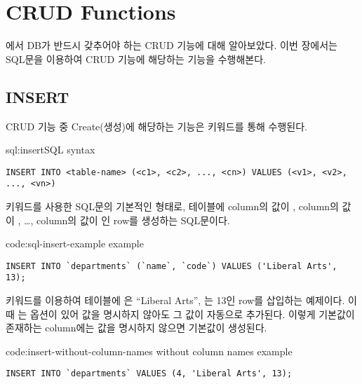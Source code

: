 \section{CRUD Functions}\label{sect:crud}

에서 DB가 반드시 갖추어야 하는 CRUD 기능에 대해 알아보았다. 이번 장에서는 SQL문을 이용하여 CRUD 기능에 해당하는 기능을 수행해본다.

\subsection*{INSERT}

CRUD 기능 중 Create(생성)에 해당하는 기능은  키워드를 통해 수행된다.

\begin{sql}{sql:insert}{SQL  syntax}
\begin{verbatim}
INSERT INTO <table-name> (<c1>, <c2>, ..., <cn>) VALUES (<v1>, <v2>, ..., <vn>)
\end{verbatim}
\end{sql}

\는  키워드를 사용한 SQL문의 기본적인 형태로,  테이블에  column의 값이 ,  column의 값이 , \ldots,  column의 값이 인 row를 생성하는 SQL문이다.

\begin{code}{code:sql-insert-example}{ example}
\begin{verbatim}
INSERT INTO `departments` (`name`, `code`) VALUES ('Liberal Arts', 13);
\end{verbatim}
\end{code}

\은  키워드를 이용하여  테이블에 은 ``Liberal Arts'', 는 13인 row를 삽입하는 예제이다. 이때 는  옵션이 있어 값을 명시하지 않아도 그 값이 자동으로 추가된다. 이렇게 기본값이 존재하는 column에는 값을 명시하지 않으면 기본값이 생성된다.

\begin{code}{code:insert-without-column-names}{ without column names example}
\begin{verbatim}
INSERT INTO `departments` VALUES (4, 'Liberal Arts', 13);
\end{verbatim}
\end{code}

